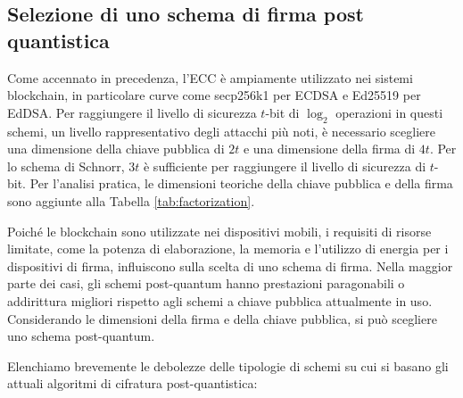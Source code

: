 \begin{table}[]
  \caption{Fattorizzazione e schemi di \(\log\) discreti, con un livello di sicurezza di 128 bit.}
  \label{tab:factorization}
\end{table}

\subsection{Selezione di uno schema di firma post quantistica}
Come accennato in precedenza, l'ECC è ampiamente utilizzato nei sistemi blockchain, in particolare curve come secp256k1 per ECDSA e Ed25519 per EdDSA. Per raggiungere il livello di sicurezza \(t\)-bit di \(\log_2\) operazioni in questi schemi, un livello rappresentativo degli attacchi più noti, è necessario scegliere una dimensione della chiave pubblica di \(2t\) e una dimensione della firma di \(4t\). Per lo schema di Schnorr, \(3t\) è sufficiente per raggiungere il livello di sicurezza di \(t\)-bit. Per l'analisi pratica, le dimensioni teoriche della chiave pubblica e della firma sono aggiunte alla Tabella \ref{tab:factorization}.

Poiché le blockchain sono utilizzate nei dispositivi mobili, i requisiti di risorse limitate, come la potenza di elaborazione, la memoria e l'utilizzo di energia per i dispositivi di firma, influiscono sulla scelta di uno schema di firma. Nella maggior parte dei casi, gli schemi post-quantum hanno prestazioni paragonabili o addirittura migliori rispetto agli schemi a chiave pubblica attualmente in uso. Considerando le dimensioni della firma e della chiave pubblica, si può scegliere uno schema post-quantum.

Elenchiamo brevemente le debolezze delle tipologie di schemi su cui si basano gli attuali algoritmi di cifratura post-quantistica:

